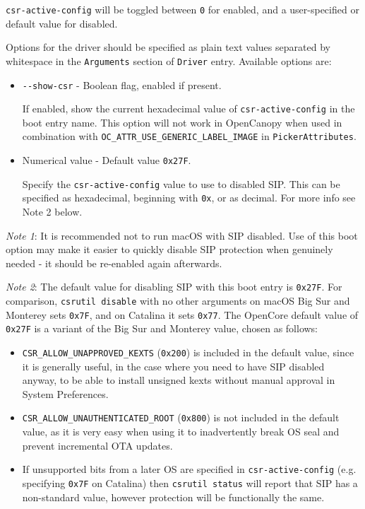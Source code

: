 \documentclass[]{article}
\providecommand{\tightlist}{%
  \setlength{\itemsep}{0pt}\setlength{\parskip}{0pt}}
\begin{document}
\texttt{csr-active-config}  will be toggled between \texttt{0} for enabled, and a user-specified or
default value for disabled.

Options for the driver should be specified as plain text values separated by whitespace in the
\texttt{Arguments} section of \texttt{Driver} entry. Available options are:

\begin{itemize}
\tightlist
  \item \texttt{-{}-show-csr} - Boolean flag, enabled if present. \medskip

  If enabled, show the current hexadecimal value of \texttt{csr-active-config} in the boot entry name.
  This option will not work in OpenCanopy when used in combination with \texttt{OC\_ATTR\_USE\_GENERIC\_LABEL\_IMAGE}
  in \texttt{PickerAttributes}. \medskip

  \item Numerical value - Default value \texttt{0x27F}. \medskip

  Specify the \texttt{csr-active-config} value to use to disabled SIP. This can be specified as
  hexadecimal, beginning with \texttt{0x}, or as decimal. For more info see Note 2 below. \medskip
\end{itemize}

\emph{Note 1}: It is recommended not to run macOS with
SIP disabled. Use of this boot option may make it easier to quickly disable SIP
protection when genuinely needed - it should be re-enabled again afterwards.

\emph{Note 2}: The default value for disabling SIP with this boot entry is \texttt{0x27F}.
For comparison, \texttt{csrutil disable} with no other arguments on macOS Big Sur and Monterey
sets \texttt{0x7F}, and on Catalina it sets \texttt{0x77}. The OpenCore default value of \texttt{0x27F}
is a variant of the Big Sur and Monterey value, chosen as follows:
\begin{itemize}
\tightlist
\item \texttt{CSR\_ALLOW\_UNAPPROVED\_KEXTS} (\texttt{0x200}) is included in the default value,
since it is generally useful, in the case where you need to have SIP disabled anyway, to be
able to install unsigned kexts without manual approval in System Preferences.
\item \texttt{CSR\_ALLOW\_UNAUTHENTICATED\_ROOT} (\texttt{0x800}) is not included in the default
value, as it is very easy when using it to inadvertently break OS seal and prevent incremental OTA updates.
\item If unsupported bits from a later OS are specified in \texttt{csr-active-config}
(e.g. specifying \texttt{0x7F} on Catalina) then \texttt{csrutil status}
will report that SIP has a non-standard value, however protection will be functionally the same.
\end{itemize}
\end{document}
